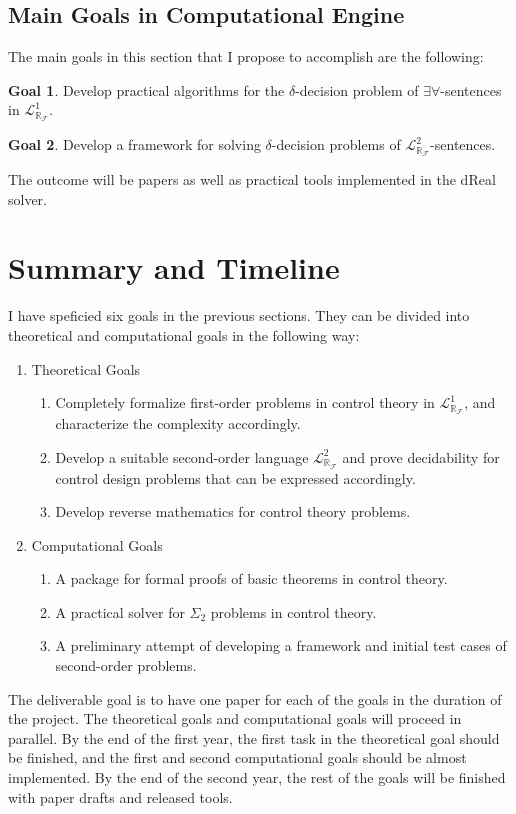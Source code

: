 \documentclass[10pt]{article}
\newcommand{\lrf}{\mathcal{L}_{\mathbb{R}_{\mathcal{F}}}}
\theoremstyle{definition}
\newtheorem{goal}{Goal}
\begin{document}
\subsection{Main Goals in Computational Engine}

The main goals in this section that I propose to accomplish are the following:
\begin{goal}
Develop practical algorithms for the $\delta$-decision problem of $\exists\forall$-sentences in $\lrf^1$.
\end{goal}
\begin{goal}
Develop a framework for solving $\delta$-decision problems of $\lrf^2$-sentences.
\end{goal}
The outcome will be papers as well as practical tools implemented in the dReal solver. 

\section{Summary and Timeline}\label{summary}

I have speficied six goals in the previous sections. They can be divided into theoretical and computational goals in the following way:
\begin{enumerate}
\item Theoretical Goals
\begin{enumerate}
\item Completely formalize first-order problems in control theory in $\lrf^1$, and characterize the complexity accordingly. 
\item Develop a suitable second-order language $\lrf^2$ and prove decidability for control design problems that can be expressed accordingly. 
\item Develop reverse mathematics for control theory problems.
\end{enumerate}
\item Computational Goals
\begin{enumerate}
\item A package for formal proofs of basic theorems in control theory. 
\item A practical solver for $\Sigma_2$ problems in control theory. 
\item A preliminary attempt of developing a framework and initial test cases of second-order problems. 
\end{enumerate}
\end{enumerate}

The deliverable goal is to have one paper for each of the goals in the duration of the project. The theoretical goals and computational goals will proceed in parallel. By the end of the first year, the first task in the theoretical goal should be finished, and the first and second computational goals should be almost implemented. By the end of the second year, the rest of the goals will be finished with paper drafts and released tools. 
\end{document}
